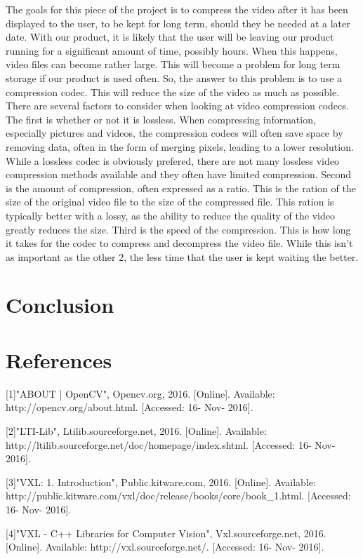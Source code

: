 \documentclass[letterpaper,10pt,onecolumn,draftclsnofoot]{IEEEtran}
\begin{document}
The goals for this piece of the project is to compress the video after it has been displayed to the user, to be kept for long term, should they be needed at a later date.
With our product, it is likely that the user will be leaving our product running for a significant amount of time, possibly hours.
When this happens, video files can become rather large.
This will become a problem for long term storage if our product is used often.
So, the answer to this problem is to use a compression codec.
This will reduce the size of the video as much as possible.
There are several factors to consider when looking at video compression codecs.
The first is whether or not it is lossless.
When compressing information, especially pictures and videos, the compression codecs will often save space by removing data, often in the form of merging pixels, leading to a lower resolution.
While a lossless codec is obviously prefered, there are not many lossless video compression methods available and they often have limited compression.
Second is the amount of compression, often expressed as a ratio.
This is the ration of the size of the original video file to the size of the compressed file.
This ration is typically better with a lossy, as the ability to reduce the quality of the video greatly reduces the size.
Third is the speed of the compression.
This is how long it takes for the codec to compress and decompress the video file.
While this isn't as important as the other 2, the less time that the user is kept waiting the better.

\newpage
\section{Conclusion}

\section{References}

[1]"ABOUT | OpenCV", Opencv.org, 2016. [Online]. Available: http://opencv.org/about.html. [Accessed: 16- Nov- 2016].

[2]"LTI-Lib", Ltilib.sourceforge.net, 2016. [Online]. Available: http://ltilib.sourceforge.net/doc/homepage/index.shtml. [Accessed: 16- Nov- 2016].

[3]"VXL: 1. Introduction", Public.kitware.com, 2016. [Online]. Available: http://public.kitware.com/vxl/doc/release/books/core/book_1.html. [Accessed: 16- Nov- 2016].

[4]"VXL - C++ Libraries for Computer Vision", Vxl.sourceforge.net, 2016. [Online]. Available: http://vxl.sourceforge.net/. [Accessed: 16- Nov- 2016].
\end{document}
